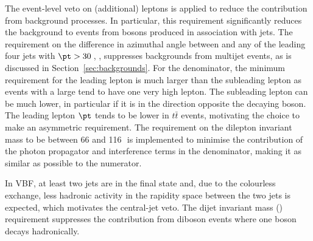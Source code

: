 \documentclass[cernpreprint,txfonts,UKenglish,texlive=2016]{\ATLASLATEXPATH atlasdoc}
\begin{document}
The event-level veto on (additional) leptons is applied to reduce the contribution
from background processes. In particular, this requirement
significantly reduces the background to \ptmissjet{} events from \W{}
bosons produced in association with jets.
The requirement on
the difference in azimuthal angle between \ptmiss{} and any of the
leading four jets with $\pt > 30$\,\GeV,
\dphiptmissj{}, suppresses backgrounds from multijet events, as is
discussed in Section~\ref{sec:backgrounds}.
For the denominator, the minimum \pt{} requirement for the leading lepton is much larger than the
subleading lepton as events with a large \ptmiss{} tend to have
one very high \pt{} lepton. The subleading lepton \pt{} can be much lower,
in particular if it is in the direction opposite the
decaying \Z{} boson. 
The leading lepton $\pt$ tends to be lower in
$t\bar{t}$ events, motivating the choice to make an asymmetric requirement.
The requirement on the dilepton invariant mass to be between
66 and 116\,\GeV\ is implemented to minimise the contribution of the photon
propagator and interference terms in the
denominator, making it as similar as possible to the numerator.

In VBF, at least two jets
are in the final state and, due to the colourless exchange, less hadronic
activity in the rapidity space between the two jets is expected,
which motivates the central-jet veto. The
 dijet invariant mass (\mjj{}) requirement suppresses the contribution
from diboson events where one boson decays hadronically. 
\end{document}
